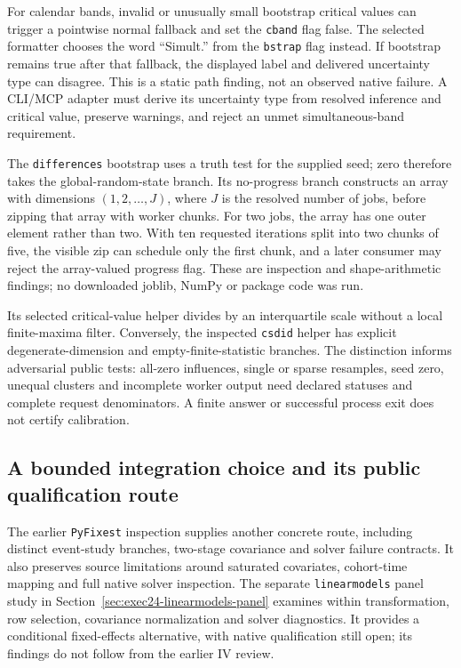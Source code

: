 For calendar bands, invalid or unusually small bootstrap critical values
can trigger a pointwise normal fallback and set the \texttt{cband} flag
false. The selected formatter chooses the word ``Simult.'' from the
\texttt{bstrap} flag instead. If bootstrap remains true after that fallback,
the displayed label and delivered uncertainty type can disagree. This is a
static path finding, not an observed native failure. A CLI/MCP adapter must
derive its uncertainty type from resolved inference and critical value,
preserve warnings, and reject an unmet simultaneous-band requirement.
\citep{exec24_panelpy_csdid,exec24_panelpy_contract}

The \texttt{differences} bootstrap uses a truth test for the supplied seed;
zero therefore takes the global-random-state branch. Its no-progress branch
constructs an array with dimensions $(1,2,\ldots,J)$, where $J$ is the
resolved number of jobs, before zipping that array with worker chunks.
For two jobs, the array has one outer element rather than two. With ten
requested iterations split into two chunks of five, the visible zip can
schedule only the first chunk, and a later consumer may reject the
array-valued progress flag. These are inspection and shape-arithmetic
findings; no downloaded joblib, NumPy or package code was run.
\citep{exec24_panelpy_differences,exec24_panelpy_contract}

Its selected critical-value helper divides by an interquartile scale without
a local finite-maxima filter. Conversely, the inspected \texttt{csdid}
helper has explicit degenerate-dimension and empty-finite-statistic branches.
The distinction informs adversarial public tests: all-zero influences,
single or sparse resamples, seed zero, unequal clusters and incomplete
worker output need declared statuses and complete request denominators.
A finite answer or successful process exit does not certify calibration.
\citep{exec24_panelpy_differences,exec24_panelpy_csdid}

\subsection{A bounded integration choice and its public qualification route}
The earlier \texttt{PyFixest} inspection supplies another concrete route,
including distinct event-study branches, two-stage covariance and solver
failure contracts. It also preserves source limitations around saturated
covariates, cohort-time mapping and full native solver inspection.
The separate \texttt{linearmodels} panel study in
Section~\ref{sec:exec24-linearmodels-panel} examines within transformation,
row selection, covariance normalization and solver diagnostics. It provides
a conditional fixed-effects alternative, with native qualification still open;
its findings do not follow from the earlier IV review.
\citep{exec23_pyfixest_reuse_source,exec22_linearmodels_reuse}

